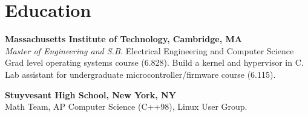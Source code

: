 \section{Education}

\textbf{Massachusetts Institute of Technology, Cambridge, MA}\\
\textit{Master of Engineering and S.B.} Electrical Engineering and Computer Science\\
Grad level operating systems course (6.828). Build a kernel and hypervisor in C.\\
Lab assistant for undergraduate microcontroller/firmware course (6.115).

\textbf{Stuyvesant High School, New York, NY}\\
Math Team, AP Computer Science (C++98), Linux User Group.

